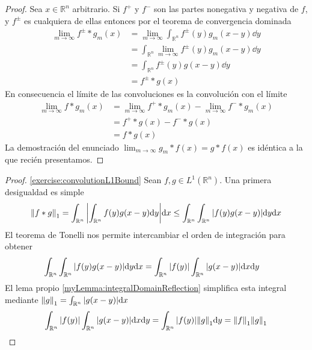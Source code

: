 \documentclass{article}
\newcommand{\realNumbers}{\mathbb{R}}
\newcommand{\integrableFunctions}{L^1(\realNumbers^n)}
\theoremstyle{remark}
\begin{document}
  \begin{proof}
    Sea \(x \in \realNumbers^n\) arbitrario.
    Si \(f^+\) y \(f^-\) son las partes nonegativa y negativa de \(f\), y \(f^{\pm}\) es cualquiera de ellas entonces por el teorema de convergencia dominada
    \begin{align}
      \lim_{m \rightarrow \infty} f^{\pm} * g_m (x)
      &=
      \lim_{m \rightarrow \infty} \int_{\realNumbers^n} f^{\pm}(y)  g_m (x - y) \dd y
      \\
      &=
      \int_{\realNumbers^n} \lim_{m \rightarrow \infty} f^{\pm}(y)  g_m (x - y) \dd y
      \\
      &=
      \int_{\realNumbers^n} f^{\pm}(y) g(x - y) \dd y
      \\
      &=
      f^{\pm} * g (x)
    \end{align}
    En consecuencia el límite de las convoluciones es la convolución con el límite
    \begin{align}
      \lim_{m \rightarrow \infty} 
        f * g_m (x)
      &=
      \lim_{m \rightarrow \infty}
        f^+ * g_m (x)
      - \lim_{m \rightarrow \infty}
        f^- * g_m (x)
      \\
      &=
      f^+ * g (x) - f^- * g (x)
      \\
      &=
      f * g (x)
    \end{align}
    La demostración del enunciado
    \(
      \lim_{m \rightarrow \infty} 
        g_m * f (x)
      =
      g * f (x)
    \)
    es idéntica a la que recién presentamos.
  \end{proof}

  \begin{proof}
    \ref{exercise:convolutionL1Bound}
    Sean \(f, g \in \integrableFunctions\).
    Una primera desigualdad es simple
    \begin{align}
      \norm{f * g}_1
      =
      \int_{\realNumbers^n} \abs{\int_{\realNumbers^n} f(y) g(x - y) \dd y} \dd x
      \leq
      \int_{\realNumbers^n} \int_{\realNumbers^n} \abs{f(y) g(x - y)} \dd y \dd x
    \end{align}
    El teorema de Tonelli nos permite intercambiar el orden de integración para obtener
    \begin{align}
      \int_{\realNumbers^n} \int_{\realNumbers^n} \abs{f(y) g(x - y)} \dd y \dd x
      &=
      \int_{\realNumbers^n} \abs{f(y)} \int_{\realNumbers^n} \abs{g(x - y)} \dd x \dd y
    \end{align}
    El lema propio \ref{myLemma:integralDomainReflection} simplifica esta integral mediante \(\norm{g}_1 = \int_{\realNumbers^n} \abs{g(x - y)} \dd x\)
    \begin{align}
      \int_{\realNumbers^n} \abs{f(y)} \int_{\realNumbers^n} \abs{g(x - y)} \dd x \dd y
      =
      \int_{\realNumbers^n} \abs{f(y)} \norm{g}_1 \dd y
      =
      \norm{f}_1 \norm{g}_1
    \end{align}
    
  \end{proof}
\end{document}
